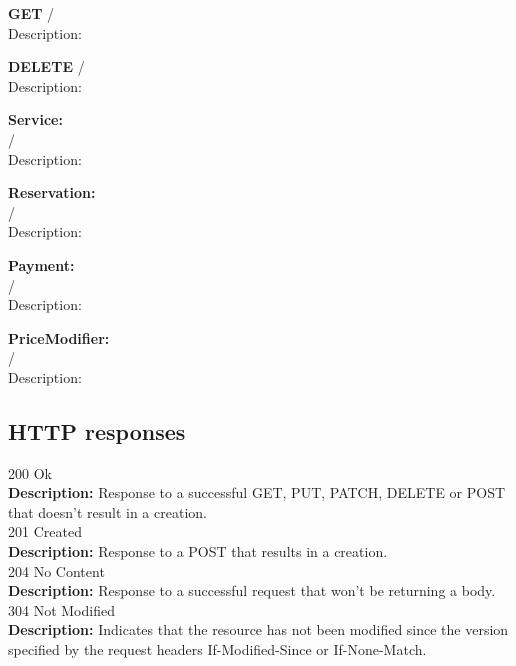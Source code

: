 \documentclass[11pt,a4paper,pdftex]{article}
\begin{document}
\hspace*{1em}\textbf{GET} /\\
\hspace*{2em}Description: 

\hspace*{1em}\textbf{DELETE} /\\
\hspace*{2em}Description: 

\textbf{Service:}\\
\hspace*{1em}\textbf{ } /\\
\hspace*{2em}Description: 

\textbf{Reservation:}\\
\hspace*{1em}\textbf{ } /\\
\hspace*{2em}Description: 

\textbf{Payment:}\\
\hspace*{1em}\textbf{ } /\\
\hspace*{2em}Description: 

\textbf{PriceModifier:}\\
\hspace*{1em}\textbf{ } /\\
\hspace*{2em}Description: 

\subsection{HTTP responses}
\hspace*{1em}200 Ok\\
\hspace*{2em}\textbf{Description:} Response to a successful GET, PUT, PATCH, DELETE or POST that doesn't result in a creation.\\
\hspace*{1em}201 Created\\
\hspace*{2em}\textbf{Description:} Response to a POST that results in a creation.\\
\hspace*{1em}204 No Content\\
\hspace*{2em}\textbf{Description:} Response to a successful request that won't be returning a body.\\
\hspace*{1em}304 Not Modified\\
\hspace*{2em}\textbf{Description:} Indicates that the resource has not been modified since the version specified by the request headers If-Modified-Since or If-None-Match.
\end{document}
